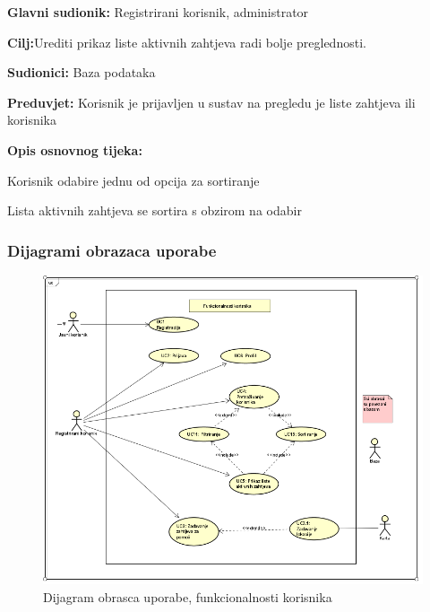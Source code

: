\noindent {}
\begin{packed_item}
	\item \textbf{Glavni sudionik: }Registrirani korisnik, administrator
	\item  \textbf{Cilj:}Urediti prikaz liste aktivnih zahtjeva radi bolje preglednosti.
	\item  \textbf{Sudionici:} Baza podataka
	\item  \textbf{Preduvjet:} Korisnik je prijavljen u sustav na pregledu je liste zahtjeva ili korisnika
	\item  \textbf{Opis osnovnog tijeka:}
	
	\item[] \begin{packed_enum}
		
		\item 	Korisnik odabire jednu od opcija za sortiranje
		\item 	Lista aktivnih zahtjeva se sortira s obzirom na odabir
	\end{packed_enum}
\end{packed_item}


\newpage
\subsubsection{Dijagrami obrazaca uporabe}

\begin{figure}[H]
	\includegraphics[scale=0.7]{slike/uc_funkcionalnosti_korisnika.png} %
	\centering
	\caption { Dijagram obrasca uporabe, funkcionalnosti korisnika}
	\label{fig:promjene}
\end{figure}

